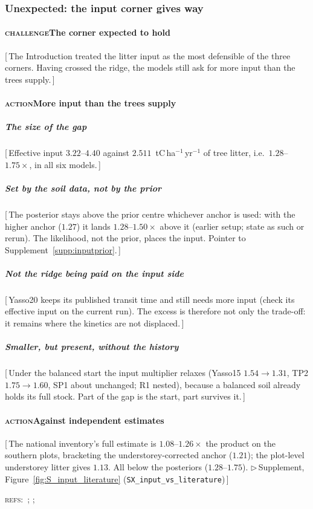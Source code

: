 \documentclass[11pt]{article}
\newcommand{\beat}[1]{\textcolor{black!45}{\textsc{\small #1}}\enspace}
\newcommand{\gap}[1]{\textcolor{red!70!black}{\small[\,#1\,]}}
\newcommand{\refs}[1]{\par\textcolor{red!70!black}{\footnotesize\textsc{refs:}\ #1}\par}
\newcommand{\suppanchor}[2]{\textcolor{red!70!black}{\small$\triangleright$\,Supplement,
  Figure~\ref{fig:#1} (\texttt{#2})}}
\begin{document}
\subsubsection{Unexpected: the input corner gives way}\label{sec:r2inputgap}
\paragraph{\beat{challenge}The corner expected to hold}
\gap{The Introduction treated the litter input as the most defensible of the three corners.
Having crossed the ridge, the models still ask for more input than the trees supply.}
\paragraph{\beat{action}More input than the trees supply}
\subparagraph{The size of the gap}
\gap{Effective input $3.22$--$4.40$ against $2.511$~tC\,ha$^{-1}$\,yr$^{-1}$ of tree litter,
i.e.\ $1.28$--$1.75\times$, in all six models.}
\subparagraph{Set by the soil data, not by the prior}
\gap{The posterior stays above the prior centre whichever anchor is used: with the higher
anchor ($1.27$) it lands $1.28$--$1.50\times$ above it (earlier setup; state as such or rerun).
The likelihood, not the prior, places the input. Pointer to Supplement~\ref{supp:inputprior}.}
\subparagraph{Not the ridge being paid on the input side}
\gap{Yasso20 keeps its published transit time and still needs more input (check its effective
input on the current run). The excess is therefore not only the trade-off: it remains where
the kinetics are not displaced.}
\subparagraph{Smaller, but present, without the history}
\gap{Under the balanced start the input multiplier relaxes (Yasso15 $1.54\rightarrow1.31$, TP2
$1.75\rightarrow1.60$, SP1 about unchanged; R1 nested), because a balanced soil already holds its
full stock. Part of the gap is the start, part survives it.}
\paragraph{\beat{action}Against independent estimates}
\gap{The national inventory's full estimate is $1.08$--$1.26\times$ the product on the southern
plots, bracketing the understorey-corrected anchor ($1.21$); the plot-level understorey litter
gives $1.13$. All below the posteriors ($1.28$--$1.75$).
\suppanchor{S_input_literature}{SX\_input\_vs\_literature}}
\refs{\citet{LehtonenHeikkinen2015}; \citet{Gower2001}; \citet{StatFin2025NID}}
\end{document}
